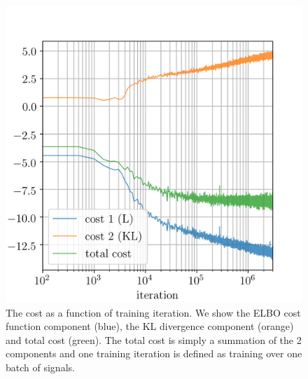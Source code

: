 %
%
\begin{figure}
    \includegraphics[width=\columnwidth]{inv_losses_log.png}
\caption[The \texttt{VItamin} cost as a function of training iteration.]{\label{fig:loss_log} The cost as a function of training iteration. We
show the \ac{ELBO} cost function component (blue), the \ac{KL} divergence
component (orange) and total cost (green). The total cost is simply a
summation of the 2 components and one training iteration is defined as
training over one batch of signals.}
\end{figure}

